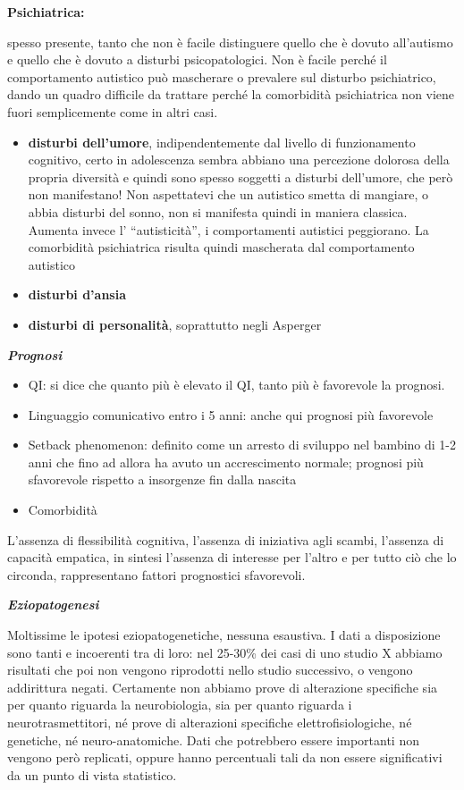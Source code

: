 \documentclass[]{article}
\begin{document}
\textbf{Psichiatrica:}

spesso presente, tanto che non è facile distinguere quello che è dovuto
all'autismo e quello che è dovuto a disturbi psicopatologici. Non è
facile perché il comportamento autistico può mascherare o prevalere sul
disturbo psichiatrico, dando un quadro difficile da trattare perché la
comorbidità psichiatrica non viene fuori semplicemente come in altri
casi.

\begin{itemize}
\item
  \textbf{disturbi dell'umore}, indipendentemente dal livello di
  funzionamento cognitivo, certo in adolescenza sembra abbiano una
  percezione dolorosa della propria diversità e quindi sono spesso
  soggetti a disturbi dell'umore, che però non manifestano! Non
  aspettatevi che un autistico smetta di mangiare, o abbia disturbi del
  sonno, non si manifesta quindi in maniera classica. Aumenta invece l'
  ``autisticità'', i comportamenti autistici peggiorano. La comorbidità
  psichiatrica risulta quindi mascherata dal comportamento autistico
\item
  \textbf{disturbi d'ansia}
\item
  \textbf{disturbi di personalità}, soprattutto negli Asperger
\end{itemize}

\emph{\textbf{Prognosi}}

\begin{itemize}
\item
  QI: si dice che quanto più è elevato il QI, tanto più è favorevole la
  prognosi.
\item
  Linguaggio comunicativo entro i 5 anni: anche qui prognosi più
  favorevole
\item
  Setback phenomenon: definito come un arresto di sviluppo nel bambino
  di 1-2 anni che fino ad allora ha avuto un accrescimento normale;
  prognosi più sfavorevole rispetto a insorgenze fin dalla nascita
\item
  Comorbidità
\end{itemize}

L'assenza di flessibilità cognitiva, l'assenza di iniziativa agli
scambi, l'assenza di capacità empatica, in sintesi l'assenza di
interesse per l'altro e per tutto ciò che lo circonda, rappresentano
fattori prognostici sfavorevoli.

\emph{\textbf{Eziopatogenesi }}

Moltissime le ipotesi eziopatogenetiche, nessuna esaustiva. I dati a
disposizione sono tanti e incoerenti tra di loro: nel 25-30\% dei casi
di uno studio X abbiamo risultati che poi non vengono riprodotti nello
studio successivo, o vengono addirittura negati. Certamente non abbiamo
prove di alterazione specifiche sia per quanto riguarda la
neurobiologia, sia per quanto riguarda i neurotrasmettitori, né prove di
alterazioni specifiche elettrofisiologiche, né genetiche, né
neuro-anatomiche. Dati che potrebbero essere importanti non vengono però
replicati, oppure hanno percentuali tali da non essere significativi da
un punto di vista statistico.
\end{document}
